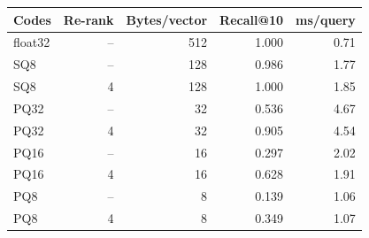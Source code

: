 \begin{tabular}{lrrrr}
\toprule
Codes & Re-rank & Bytes/vector & Recall@10 & ms/query \\
\midrule
float32 & -- & 512 & 1.000 & 0.71 \\
SQ8 & -- & 128 & 0.986 & 1.77 \\
SQ8 & 4 & 128 & 1.000 & 1.85 \\
PQ32 & -- & 32 & 0.536 & 4.67 \\
PQ32 & 4 & 32 & 0.905 & 4.54 \\
PQ16 & -- & 16 & 0.297 & 2.02 \\
PQ16 & 4 & 16 & 0.628 & 1.91 \\
PQ8 & -- & 8 & 0.139 & 1.06 \\
PQ8 & 4 & 8 & 0.349 & 1.07 \\
\bottomrule
\end{tabular}
